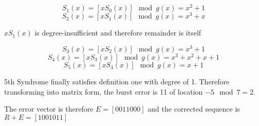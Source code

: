 \documentclass[12pt,a4paper,violet]{bbe}
\begin{document}
\begin{equation}
    S_1(x)=[xS_0(x)]\mod g(x)=x^2+1
\end{equation}
\begin{equation}
    S_2(x)=[xS_1(x)]\mod g(x)=x^3+x
\end{equation}
\begin{remark}
    \(xS_1(x)\) is degree-insufficient and therefore remainder is itself 
\end{remark}
\begin{equation}
    S_3(x)=[xS_2(x)]\mod g(x)=x^3+1
\end{equation}
\begin{equation}
    S_4(x)=[xS_3(x)]\mod g(x)=x^3+x^2+x+1
\end{equation}
\begin{equation}
    S_5(x)=[xS_4(x)]\mod g(x)=x+1
\end{equation}

5th Syndrome finally satisfies definition one with degree of 1. Therefore transforming into matrix form, the burst error is 11 of location \(-5 \mod 7=2\). 

The error vector is therefore \(E=[0011000]\) and the corrected sequence is \(R+E=[1001011]\)
	\blinddocument
\end{document}
